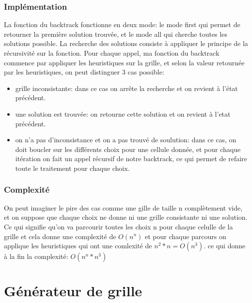 \documentclass[12pt]{article}
\begin{document}
     \subsubsection{Implémentation}
     La fonction du backtrack fonctionne en deux mode: le mode first qui permet de retourner la première solution trouvée, et le mode all qui cherche toutes les solutions possible. La recherche des solutions consiste à appliquer le principe de la récursivité sur la fonction. Pour chaque appel, ma fonction du backtrack commence par appliquer les heuristiques sur la grille, et selon la valeur retournée par les heuristiques, on peut distinguer 3 cas possible:
     \begin{itemize}
         \item grille inconsistante: dans ce cas on arrête la recherche et on revient à l'état précédent.
         \item une solution est trouvée: on retourne cette solution et on revient à l'etat précédent.
         \item on n'a pas d'inconsistance et on a pas trouvé de soulution: dans ce cas, on doit boucler sur les différents choix pour une cellule donnée, et pour chaque itération on fait un appel récursif de notre backtrack, ce qui permet de refaire toute le traitement pour chaque choix.
     \end{itemize}
     \subsubsection{Complexité}
     On peut imaginer le pire des cas comme une gille de taille n complètement vide, et on suppose que chaque choix ne donne ni une grille consistante ni une solution. Ce qui signifie qu'on va parcourir toutes les choix n pour chaque celulle de la grille et cela donne une complexité de $O(n^n)$ et pour chaque parcours on applique les heuristiques qui ont une comlexité de $n^2 * n = O(n^3)$. ce qui donne à la fin la complexité: $O(n^n*n^3)$
    \section{Générateur de grille}
\end{document}

